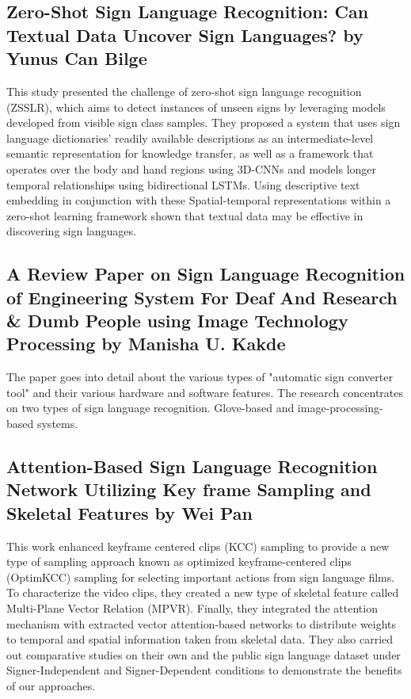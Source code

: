 \documentclass[12pt,a4paper]{report}
\begin{document}
\subsection{Zero-Shot Sign Language Recognition: Can Textual Data Uncover Sign Languages? by Yunus Can Bilge\cite{b2}}
This study presented the challenge of zero-shot sign language recognition (ZSSLR), which aims to detect instances of unseen signs by leveraging models developed from visible sign class samples. They proposed a system that uses sign language dictionaries' readily available descriptions as an intermediate-level semantic representation for knowledge transfer, as well as a framework that operates over the body and hand regions using 3D-CNNs and models longer temporal relationships using bidirectional LSTMs. Using descriptive text embedding in conjunction with these Spatial-temporal representations within a zero-shot learning framework shown that textual data may be effective in discovering sign languages.

\subsection{A Review Paper on Sign Language Recognition of Engineering System For Deaf And Research \& Dumb People using Image Technology Processing by Manisha U. Kakde\cite{b3}}
The paper goes into detail about the various types of "automatic sign converter tool" and their various hardware and software features. The research concentrates on two types of sign language recognition. Glove-based and image-processing-based systems.

\subsection{Attention-Based Sign Language Recognition Network Utilizing Key frame Sampling and Skeletal Features by Wei Pan\cite{b4}}
This work enhanced keyframe centered clips (KCC) sampling to provide a new type of sampling approach known as optimized keyframe-centered clips (OptimKCC) sampling for selecting important actions from sign language films. To characterize the video clips, they created a new type of skeletal feature called Multi-Plane Vector Relation (MPVR). Finally, they integrated the attention mechanism with extracted vector attention-based networks to distribute weights to temporal and spatial information taken from skeletal data. They also carried out comparative studies on their own and the public sign language dataset under Signer-Independent and Signer-Dependent conditions to demonstrate the benefits of our approaches.
\end{document}
